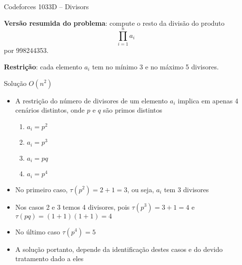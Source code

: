 \begin{frame}[fragile]{Codeforces 1033D -- Divisors}

    \textbf{Versão resumida do problema}: compute o resto da divisão do produto
    $$
        \prod_{i = 1}^n a_i
    $$
    por 998244353.

    \vspace{0.1in}
    \textbf{Restrição}: cada elemento $a_i$ tem no mínimo 3 e no máximo 5 divisores.

\end{frame}

\begin{frame}[fragile]{Solução $O(n^2)$}

    \begin{itemize}
        \item A restrição do número de divisores de um elemento $a_i$ implica em apenas 4 cenários
            distintos, onde $p$ e $q$ são primos distintos
        \begin{enumerate}
            \item $a_i = p^2$
            \item $a_i = p^3$
            \item $a_i = pq$
            \item $a_i = p^4$
        \end{enumerate}

        \item No primeiro caso, $\tau(p^2) = 2 + 1 = 3$, ou seja, $a_i$ tem 3 divisores

        \item Nos casos 2 e 3 temos 4 divisores, pois $\tau(p^3) = 3 + 1 = 4$ e 
            $\tau(pq) = (1 + 1)(1 + 1) = 4$

        \item No último caso $\tau(p^4) = 5$

        \item A solução portanto, depende da identificação destes casos e do devido tratamento
            dado a eles
    \end{itemize}

\end{frame}

